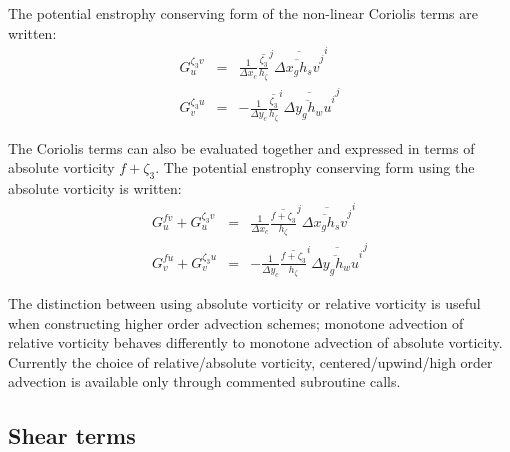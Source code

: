The potential enstrophy conserving form of the non-linear Coriolis
terms are written:
\begin{eqnarray}
G_u^{\zeta_3 v} & = &
\frac{1}{\Delta x_c}
\overline{ \frac{\zeta_3}{h_\zeta} }^j \overline{ \overline{ \Delta x_g h_s v }^j }^i \\
G_v^{\zeta_3 u} & = & -
\frac{1}{\Delta y_c}
\overline{ \frac{\zeta_3}{h_\zeta} }^i \overline{ \overline{ \Delta y_g h_w u }^i }^j
\end{eqnarray}

The Coriolis terms can also be evaluated together and expressed in
terms of absolute vorticity $f+\zeta_3$. The potential enstrophy
conserving form using the absolute vorticity is written:
\begin{eqnarray}
G_u^{fv} + G_u^{\zeta_3 v} & = &
\frac{1}{\Delta x_c}
\overline{ \frac{f + \zeta_3}{h_\zeta} }^j \overline{ \overline{ \Delta x_g h_s v }^j }^i \\
G_v^{fu} + G_v^{\zeta_3 u} & = & -
\frac{1}{\Delta y_c}
\overline{ \frac{f + \zeta_3}{h_\zeta} }^i \overline{ \overline{ \Delta y_g h_w u }^i }^j
\end{eqnarray}

 The
distinction between using absolute vorticity or relative vorticity is
useful when constructing higher order advection schemes; monotone
advection of relative vorticity behaves differently to monotone
advection of absolute vorticity. Currently the choice of
relative/absolute vorticity, centered/upwind/high order advection is
available only through commented subroutine calls.



\subsection{Shear terms}

